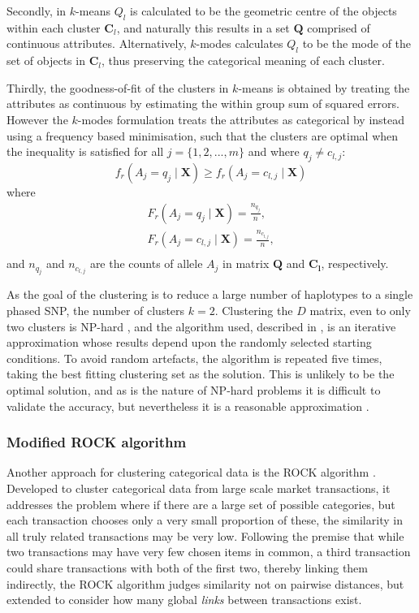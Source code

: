 Secondly, in $k$-means $Q_l$ is calculated to be the geometric centre of the objects within each cluster $\mathbf{C}_l$, and naturally this results in a set $\mathbf{Q}$ comprised of continuous attributes. Alternatively, $k$-modes calculates $Q_l$ to be the mode of the set of objects in $\mathbf{C}_l$, thus preserving the categorical meaning of each cluster.

Thirdly, the goodness-of-fit of the clusters in $k$-means is obtained by treating the attributes as continuous by estimating the within group sum of squared errors. However the $k$-modes formulation treats the attributes as categorical by instead using a frequency based minimisation, such that the clusters are optimal when the inequality is satisfied for all $j = \{1, 2, ..., m\}$ and where $q_{j} \neq c_{l,j}$:
\begin{equation}
f_{r}(A_{j} = q_{j} \mid \mathbf{X}) \geq f_{r}(A_{j} = c_{l, j}	 \mid \mathbf{X})
\end{equation}
where
\begin{eqnarray}
F_{r}(A_{j} = q_{j} \mid \mathbf{X}) = \frac{n_{q_{j}}} {n}, \\
F_{r}(A_{j} = c_{l,j} \mid \mathbf{X}) = \frac{n_{c_{l,j}}} {n}, \\
\end{eqnarray}
and $n_{q_{j}}$ and $n_{c_{l,j}}$ are the counts of allele $A_{j}$ in matrix $\mathbf{Q}$ and $\mathbf{C_{l}}$, respectively.

As the goal of the clustering is to reduce a large number of haplotypes to a single phased SNP, the number of clusters $k=2$. Clustering the $D$ matrix, even to only two clusters is NP-hard \citep{Aloise2009}, and the algorithm used, described in \citet{He2006}, is an iterative approximation whose results depend upon the randomly selected starting conditions. To avoid random artefacts, the algorithm is repeated five times, taking the best fitting clustering set as the solution. This is unlikely to be the optimal solution, and as is the nature of NP-hard problems it is difficult to validate the accuracy, but nevertheless it is a reasonable approximation \citep{He2006}.


\subsubsection{Modified ROCK algorithm}

Another approach for clustering categorical data is the ROCK algorithm \citep{Guha2000}. Developed to cluster categorical data from large scale market transactions, it addresses the problem where if there are a large set of possible categories, but each transaction chooses only a very small proportion of these, the similarity in all truly related transactions may be very low. Following the premise that while two transactions may have very few chosen items in common, a third transaction could share transactions with both of the first two, thereby linking them indirectly, the ROCK algorithm judges similarity not on pairwise distances, but extended to consider how many global \emph{links} between transactions exist.

